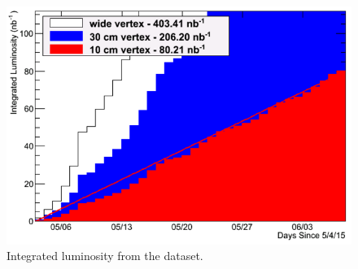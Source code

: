 \begin{figure}[!h]
\begin{center}
\includegraphics[width=0.65\linewidth]{figs/integrated_luminosity.png}
\caption{Integrated luminosity from the \pau dataset.}
\end{center}
\end{figure}

\fi




